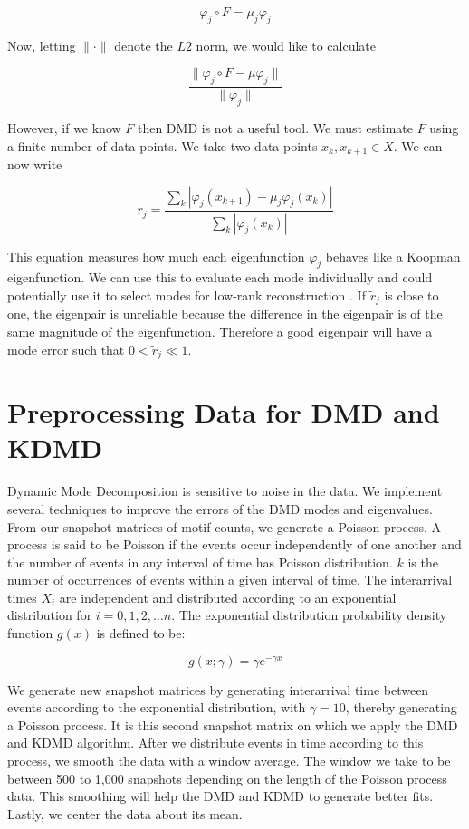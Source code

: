 $$
\varphi_j \circ F = \mu_j \varphi_j
$$

\noindent Now, letting $\|\cdot\|$ denote the $L2$ norm, we would like to calculate 

$$
\frac{\| \varphi_j \circ F - \mu \varphi_j \|}{\| \varphi_j \|}
$$

\noindent However, if we know $F$ then DMD is not a useful tool.
We must estimate $F$ using a finite number of data points. We take
two data points $x_k, x_{k+1} \in X$. We can now write 

$$
{\tilde r}_{j} = \frac{\sum_{k} |\varphi_j(x_{k+1}) - \mu_j \varphi_j(x_{k})|}{\sum_{k} |\varphi_j(x_k )|}
$$

This equation measures how much each eigenfunction $\varphi_j$ behaves like a Koopman eigenfunction. We can use 
this to evaluate each mode individually and could potentially use it to select modes for low-rank reconstruction \cite{zhang2017evaluating}. If ${{\tilde r}_j}$ is close to one,
the eigenpair is unreliable because the difference in the eigenpair is of the same magnitude of the eigenfunction. Therefore a 
good eigenpair will have a mode error such that $0< {{\tilde r}_j} \ll 1$.

\section{Preprocessing Data for DMD and KDMD}
Dynamic Mode Decomposition is sensitive to
 noise in the data. We implement several techniques to improve the errors of the DMD modes and eigenvalues.
From our snapshot matrices of motif counts, we generate a Poisson process. A
 process is said to be Poisson if the events occur independently of one another and the 
 number of events in any interval of time has Poisson distribution.
 $k$ is the number of occurrences of events within a given interval of time. The interarrival times $X_i$ are independent
and distributed according to an exponential distribution for $i=0,1,2,\dots n$. The exponential
distribution probability density function $g(x)$ is defined to be:

$$
g(x;\gamma) = \gamma e^{-\gamma x}
$$

We generate new snapshot matrices by generating interarrival time between events according to the exponential
distribution, with $\gamma=10$, thereby generating a Poisson process. It is this second snapshot matrix on which we apply the DMD and KDMD algorithm. After we distribute events in time according to this process, we
 smooth the data with a window average. The window we take to be between 500 to 1,000 snapshots depending on the length of the Poisson process data. 
 This smoothing will help the DMD and KDMD to generate better fits. Lastly, we center the data about its mean.


